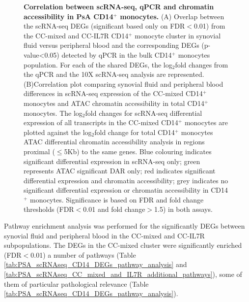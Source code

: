 \begin{figure}[H]
\caption[Correlation between scRNA-seq, qPCR and chromatin accessibility in PsA CD14$^+$ monocytes.]{\textbf{Correlation between scRNA-seq, qPCR and chromatin accessibility in PsA CD14$^+$ monocytes.} (A) Overlap between the scRNA-seq DEGs (significant based only on FDR$<$0.01) from the CC-mixed and CC-IL7R CD14$^+$ monocyte cluster in synovial fluid versus peripheral blood and the corresponding DEGs (p-value<0.05) detected by qPCR in the bulk CD14$^+$ monocytes population. For each of the shared DEGs, the log$_2$fold changes from the qPCR and the 10X scRNA-seq analysis are represented. (B)Correlation plot comparing synovial fluid and peripheral blood differences in scRNA-seq expression of the CC-mixed CD14$^+$ monocytes and ATAC chromatin accessibility in total CD14$^+$ monocytes. The log$_2$fold changes for scRNA-seq differential expression of all transcripts in the CC-mixed CD14$^+$ monocytes are plotted against the log$_2$fold change for total CD14$^+$ monocytes ATAC differential chromatin accessibility analysis in regions proximal ($\leq$5Kb) to the same genes. Blue colouring indicates significant differential expression in scRNA-seq only; green represents ATAC significant DAR only; red indicates significant differential expression and chromatin accessibility; grey indicates no significant differential expression or chromatin accessibility in CD14$^+$ monocytes. Significance is based on FDR and fold change thresholds (FDR$<$0.01 and fold change$>$1.5) in both assays.}
\label{figure:PsA_scRNAseq_qPCR_ATAC_correlation}
\end{figure}




Pathway enrichment analysis was performed for the significantly DEGs between synovial fluid and peripheral blood in the CC-mixed and CC-IL7R subpopulations. The DEGs in the CC-mixed cluster were significantly enriched (FDR$<$0.01) a number of pathways (Table \ref{tab:PSA_scRNAseq_CD14_DEGs_pathway_analysis} and \ref{tab:PSA_scRNAseq_CC_mixed_and_IL7R_additional_pathways}), some of them of particular pathological relevance (Table \ref{tab:PSA_scRNAseq_CD14_DEGs_pathway_analysis}). 

